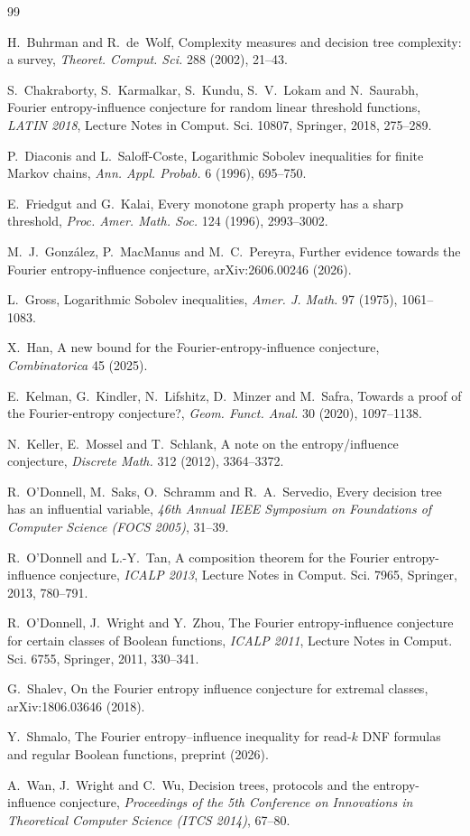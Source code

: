 \documentclass[11pt]{amsart}
\theoremstyle{remark}
\begin{document}
\begin{thebibliography}{99}

 H.~Buhrman and R.~de~Wolf, Complexity measures and decision tree complexity: a survey,
\emph{Theoret. Comput. Sci.} 288 (2002), 21--43.

 S.~Chakraborty, S.~Karmalkar, S.~Kundu, S.~V.~Lokam and N.~Saurabh, Fourier entropy-influence
conjecture for random linear threshold functions, \emph{LATIN 2018}, Lecture Notes in Comput. Sci. 10807,
Springer, 2018, 275--289.

 P.~Diaconis and L.~Saloff-Coste, Logarithmic Sobolev inequalities for finite Markov chains,
\emph{Ann. Appl. Probab.} 6 (1996), 695--750.

 E.~Friedgut and G.~Kalai, Every monotone graph property has a sharp threshold, \emph{Proc. Amer.
Math. Soc.} 124 (1996), 2993--3002.

 M.~J.~Gonz\'alez, P.~MacManus and M.~C.~Pereyra, Further evidence towards the Fourier
entropy-influence conjecture, arXiv:2606.00246 (2026).

 L.~Gross, Logarithmic Sobolev inequalities, \emph{Amer. J. Math.} 97 (1975), 1061--1083.

 X.~Han, A new bound for the Fourier-entropy-influence conjecture, \emph{Combinatorica} 45 (2025).

 E.~Kelman, G.~Kindler, N.~Lifshitz, D.~Minzer and M.~Safra, Towards a proof of the
Fourier-entropy conjecture?, \emph{Geom. Funct. Anal.} 30 (2020), 1097--1138.

 N.~Keller, E.~Mossel and T.~Schlank, A note on the entropy/influence conjecture, \emph{Discrete
Math.} 312 (2012), 3364--3372.

 R.~O'Donnell, M.~Saks, O.~Schramm and R.~A.~Servedio, Every decision tree has an influential
variable, \emph{46th Annual IEEE Symposium on Foundations of Computer Science (FOCS 2005)}, 31--39.

 R.~O'Donnell and L.-Y.~Tan, A composition theorem for the Fourier entropy-influence conjecture,
\emph{ICALP 2013}, Lecture Notes in Comput. Sci. 7965, Springer, 2013, 780--791.

 R.~O'Donnell, J.~Wright and Y.~Zhou, The Fourier entropy-influence conjecture for certain classes of
Boolean functions, \emph{ICALP 2011}, Lecture Notes in Comput. Sci. 6755, Springer, 2011, 330--341.

 G.~Shalev, On the Fourier entropy influence conjecture for extremal classes, arXiv:1806.03646 (2018).

 Y.~Shmalo, The Fourier entropy--influence inequality for read-$k$ DNF formulas and regular Boolean
functions, preprint (2026).

 A.~Wan, J.~Wright and C.~Wu, Decision trees, protocols and the entropy-influence conjecture,
\emph{Proceedings of the 5th Conference on Innovations in Theoretical Computer Science (ITCS 2014)}, 67--80.

\end{thebibliography}
\end{document}
